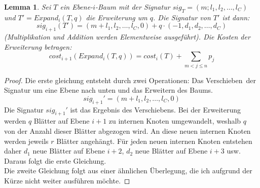 \documentclass[a4paper,10pt,ngerman]{scrartcl}
\newtheorem{lemma}[satz]{Lemma}
\begin{document}
    \begin{lemma}
        Sei $T$ ein Ebene-$i$-Baum mit der Signatur $sig_T = (m;l_1,l_2,\dots,l_C)$ und $T' = Expand_i(T,q)$ die Erweiterung um $q$. Die Signatur von $T'$ ist dann: \[sig_{i+1}(T') = (m + l_1, l_2, \dots, l_C, 0) + q \cdot (-1, d_1, d_2, \dots, d_C)\]
        (Multiplikation und Addition werden Elementweise ausgeführt). Die Kosten der Erweiterung betragen:
        \[cost_{i+1}(Expand_i(T,q)) = cost_i(T) + \sum_{m < j \le n}p_j\]
    \end{lemma}
    \begin{proof}
        Die erste gleichung entsteht durch zwei Operationen: Das \glqq Verschieben\grqq\ der Signatur um eine Ebene nach unten und das Erweitern des Baums.
        \[sig_{i+1}' = (m + l_1, l_2, \dots, l_C, 0)\]
        Die Signatur $sig_{i+1}'$ ist das Ergebnis des Verschiebens.
        Bei der Erweiterung werden $q$ Blätter auf Ebene $i + 1$ zu internen Knoten umgewandelt, weshalb $q$ von der Anzahl dieser Blätter abgezogen wird.
        An diese neuen internen Knoten werden jeweils $r$ Blätter angehängt.
        Für jeden neuen internen Knoten entstehen daher $d_1$ neue Blätter auf Ebene $i+2$, $d_2$ neue Blätter auf Ebene $i+3$ usw.
        Daraus folgt die erste Gleichung. \\
        Die zweite Gleichung folgt aus einer ähnlichen Überlegung, die ich aufgrund der Kürze nicht weiter ausführen möchte.
    \end{proof}
\end{document}
